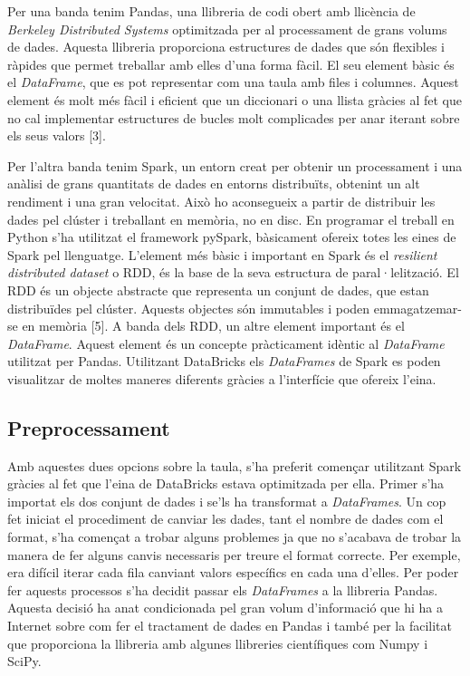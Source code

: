 \documentclass[10pt,a4paper,twocolumn,twoside]{article}
\begin{document}
Per una banda tenim Pandas, una llibreria de codi obert amb llicència de \textit{Berkeley Distributed Systems} optimitzada per al processament de grans volums de dades. Aquesta llibreria proporciona estructures de dades que són flexibles i ràpides que permet treballar amb elles d'una forma fàcil. El seu element bàsic és el \textit{DataFrame}, que es pot representar com una taula amb files i columnes. Aquest element és molt més fàcil i eficient que un diccionari o una llista gràcies al fet que no cal implementar estructures de bucles molt complicades per anar iterant sobre els seus valors [3].

Per l'altra banda tenim Spark, un entorn creat per obtenir un processament i una anàlisi de grans quantitats de dades en entorns distribuïts, obtenint un alt rendiment i una gran velocitat. Això ho aconsegueix a partir de distribuir les dades pel clúster i treballant en memòria, no en disc. En programar el treball en Python s'ha utilitzat el framework pySpark, bàsicament ofereix totes les eines de Spark pel llenguatge. L'element més bàsic i important en Spark és el \textit{resilient distributed dataset} o RDD, és la base de la seva estructura de paral·lelització. El RDD és un objecte abstracte que representa un conjunt de dades, que estan distribuïdes pel clúster. Aquests objectes són immutables i poden emmagatzemar-se en memòria [5]. A banda dels RDD, un altre element important és el \textit{DataFrame}. Aquest element és un concepte pràcticament idèntic al \textit{DataFrame} utilitzat per Pandas. Utilitzant DataBricks els \textit{DataFrames} de Spark es poden visualitzar de moltes maneres diferents gràcies a l'interfície que ofereix l'eina.
\subsection{Preprocessament}
Amb aquestes dues opcions sobre la taula, s'ha preferit començar utilitzant Spark gràcies al fet que l'eina de DataBricks estava optimitzada per ella. Primer s'ha importat els dos conjunt de dades i se'ls ha transformat a \textit{DataFrames}. Un cop fet iniciat el procediment de canviar les dades, tant el nombre de dades com el format, s'ha començat a trobar alguns problemes ja que no s'acabava de trobar la manera de fer alguns canvis necessaris per treure el format correcte. Per exemple, era difícil iterar cada fila canviant valors específics en cada una d'elles. Per poder fer aquests processos s'ha decidit passar els \textit{DataFrames} a la llibreria Pandas. Aquesta decisió ha anat condicionada pel gran volum d'informació que hi ha a Internet sobre com fer el tractament de dades en Pandas i també per la facilitat que proporciona la llibreria amb algunes llibreries científiques com Numpy i SciPy.
\end{document}
